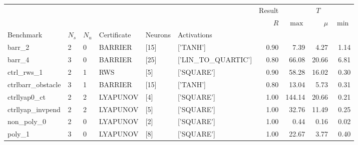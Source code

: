 \begin{tabular}{llllllrrrr}
    \toprule
                       &       &       &             &         &                      & Result & \multicolumn{3}{c}{$T$}                  \\
                       &       &       &             &         &                      & $R$    & $\max$                  & $\mu$ & $\min$ \\
    Benchmark          & $N_s$ & $N_u$ & Certificate & Neurons & Activations          &        &                         &       &        \\
    \midrule
    barr\_2            & 2     & 0     & BARRIER     & [15]    & ['TANH']             & 0.90   & 7.39                    & 4.27  & 1.14   \\
    \cline{1-10} \cline{2-10} \cline{3-10} \cline{4-10} \cline{5-10}
    barr\_4            & 3     & 0     & BARRIER     & [25]    & ['LIN\_TO\_QUARTIC'] & 0.80   & 66.08                   & 20.66 & 6.81   \\
    \cline{1-10} \cline{2-10} \cline{3-10} \cline{4-10} \cline{5-10}
    ctrl\_rws\_1       & 2     & 1     & RWS         & [5]     & ['SQUARE']           & 0.90   & 58.28                   & 16.02 & 0.30   \\
    \cline{1-10} \cline{2-10} \cline{3-10} \cline{4-10} \cline{5-10}
    ctrlbarr\_obstacle & 3     & 1     & BARRIER     & [15]    & ['TANH']             & 0.80   & 13.04                   & 5.73  & 0.31   \\
    \cline{1-10} \cline{2-10} \cline{3-10} \cline{4-10} \cline{5-10}
    ctrllyap0\_ct      & 2     & 2     & LYAPUNOV    & [4]     & ['SQUARE']           & 1.00   & 144.14                  & 20.66 & 0.21   \\
    \cline{1-10} \cline{2-10} \cline{3-10} \cline{4-10} \cline{5-10}
    ctrllyap\_invpend  & 2     & 2     & LYAPUNOV    & [5]     & ['SQUARE']           & 1.00   & 32.76                   & 11.49 & 0.25   \\
    \cline{1-10} \cline{2-10} \cline{3-10} \cline{4-10} \cline{5-10}
    non\_poly\_0       & 2     & 0     & LYAPUNOV    & [2]     & ['SQUARE']           & 1.00   & 0.44                    & 0.16  & 0.02   \\
    \cline{1-10} \cline{2-10} \cline{3-10} \cline{4-10} \cline{5-10}
    poly\_1            & 3     & 0     & LYAPUNOV    & [8]     & ['SQUARE']           & 1.00   & 22.67                   & 3.77  & 0.40   \\
    \cline{1-10} \cline{2-10} \cline{3-10} \cline{4-10} \cline{5-10}

\end{tabular}

